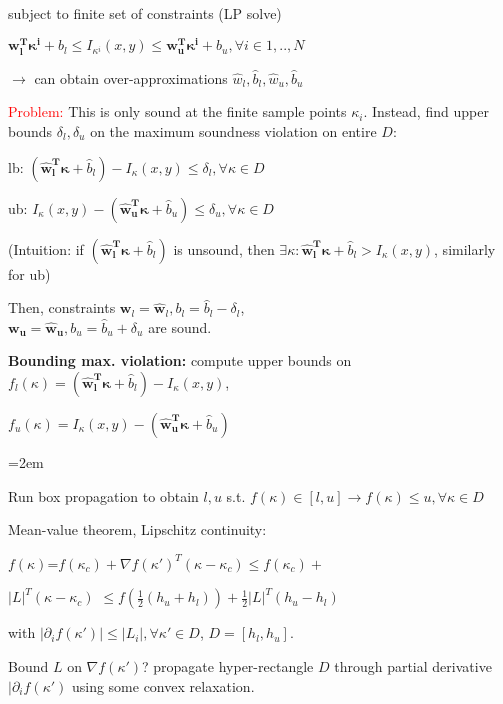 \documentclass[11pt,landscape,a4paper,fleqn]{article}
\begin{document}
\begin{multicols*}{4}
subject to finite set of constraints (LP solve)

{$\mathbf{w_l^T \kappa^i} + b_l \leq I_{\kappa^i}(x,y) \leq \mathbf{w_u^T \kappa^i} + b_u, \forall i \in {1,..,N}$}

$\rightarrow$ can obtain over-approximations $\hat{w}_l, \hat{b}_l, \hat{w}_u, \hat{b}_u$

\textcolor{red}{Problem:} This is only sound at the finite sample points $\kappa_i$. Instead, {find upper bounds $\delta_l, \delta_u$ on the maximum soundness violation on entire $D$}:

lb: $(\mathbf{\hat{w}_l^T \kappa} + \hat{b}_l) - I_\kappa(x,y) \leq \delta_l, \forall \kappa \in D$

ub: $I_\kappa(x,y) - (\mathbf{\hat{w}_u^T \kappa} + \hat{b}_u) \leq \delta_u, \forall \kappa \in D$

(Intuition: if $(\mathbf{\hat{w}_l^T \kappa} + \hat{b}_l)$ is unsound, then $\exists \kappa: \mathbf{\hat{w}_l^T \kappa} + \hat{b}_l > I_\kappa(x,y)$, similarly for ub)

Then, constraints $\mathbf{w}_l = \mathbf{\hat{w}}_l, b_l = \hat{b}_l - \delta_l$,\\
$\mathbf{w_u} = \mathbf{\hat{w}_u}, b_u = \hat{b}_u + \delta_u$ are sound.


\textbf{Bounding max. violation:} compute upper bounds on $f_l(\kappa) = (\mathbf{\hat{w}_l^T \kappa} + \hat{b}_l) - I_\kappa(x,y)$,

$f_u(\kappa) = I_\kappa(x,y) - (\mathbf{\hat{w}_u^T \kappa} + \hat{b}_u)$

\begin{compactitem}=2em
\item Run box propagation to obtain $l,u$ s.t. $f(\kappa) \in [l,u] \rightarrow f(\kappa) \leq u, \forall \kappa \in D$

\item Mean-value theorem, Lipschitz continuity:

\hspace*{-5mm} {$f(\kappa)$}=$f(\kappa_c) + \nabla f(\kappa')^T (\kappa - \kappa_c) \leq
f(\kappa_c) + $

\hspace*{-5mm} $|L|^T (\kappa - \kappa_c)$ {$\leq f(\frac{1}{2} (h_u + h_l)) + \frac{1}{2}|L|^T(h_u - h_l)$}

\vspace*{1mm}
with $|\partial_i f(\kappa')| \leq |L_i|, \forall \kappa' \in D$, $D = [h_l, h_u]$.

Bound $L$ on $\nabla f(\kappa')$? propagate hyper-rectangle $D$ through partial derivative $|\partial_i f(\kappa')$ using some convex relaxation.
\end{compactitem}
\vspace*{1mm}


\end{multicols*}
\end{document}

